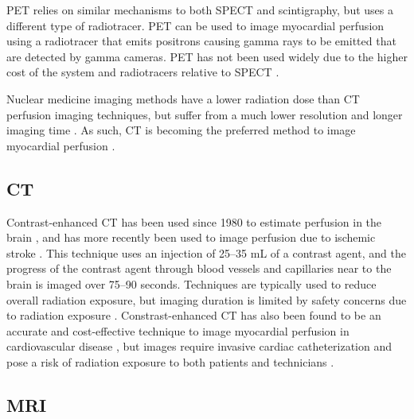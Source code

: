 PET relies on similar mechanisms to both SPECT and scintigraphy, but uses a different type 
of radiotracer. PET can be used to image myocardial perfusion using a radiotracer that 
emits positrons 
causing gamma rays to be emitted that are detected by gamma cameras. PET has 
not been used widely due to the higher cost of the system and radiotracers relative to 
SPECT \parencite{driessen_myocardial_2017}.

Nuclear medicine imaging methods have a lower radiation dose than CT perfusion imaging techniques,
but suffer from a much lower resolution and longer imaging time \parencite{aljizeeri_ct_2013}. 
As such, CT is becoming the preferred 
method to image myocardial perfusion \parencite{aljizeeri_ct_2013}. 

\subsection{CT}

Contrast-enhanced CT has been used since 1980 to estimate perfusion in the brain 
\parencite{axel_cerebral_1980}, 
and has more recently been used to image perfusion due to ischemic stroke 
\parencite{miles_colour_1991,koenig_perfusion_1998}.
This technique uses an injection of 25--35 mL 
of a contrast agent, and the progress of the contrast agent through blood vessels 
and capillaries near to the brain is imaged over  75--90 seconds. 
Techniques are typically used to reduce overall 
radiation exposure, but imaging duration is limited by 
safety concerns due to radiation exposure
\parencite{konstas_theoretic_2009}.
Constrast-enhanced CT has also been found to be an accurate and cost-effective 
technique to image myocardial perfusion in cardiovascular disease
\parencite{aljizeeri_ct_2013}, but images require invasive cardiac catheterization and 
pose a risk of radiation exposure to 
both patients and technicians \parencite{vijayalakshmi_cardiac_2007}.

\subsection{MRI}

